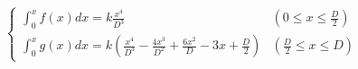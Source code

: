 \documentclass[
  11pt,
  border=2,
  convert={
    density=100 -alpha remove,
    outext=.png
  },
]{standalone}
\begin{document}
$
  \begin{cases}
    \displaystyle \int_0^x f(x) dx = k\frac{x^4}{D^3} 
      & \left(0 \leq x \leq \frac{D}{2}\right)
    \\
    \displaystyle \int_0^x g(x) dx = k\left( \frac{x^4}{D^3} - \frac{4x^3}{D^2} + \frac{6x^2}{D} - 3x + \frac{D}{2} \right) 
      & \left(\frac{D}{2} \leq x \leq D\right)
  \end{cases}
$
\end{document}
